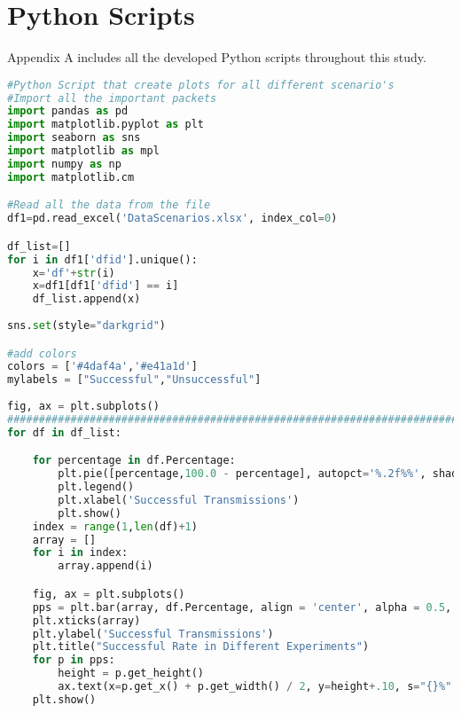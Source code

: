 

\chapter{Python Scripts}

Appendix A includes all the developed Python scripts throughout this study. 



\newpage
\begin{lstlisting}[language=Python, caption = Python Script that create plots for all different scenario's, label=lst:plots]
#Python Script that create plots for all different scenario's
#Import all the important packets
import pandas as pd 
import matplotlib.pyplot as plt 
import seaborn as sns
import matplotlib as mpl
import numpy as np
import matplotlib.cm

#Read all the data from the file
df1=pd.read_excel('DataScenarios.xlsx', index_col=0)

df_list=[]
for i in df1['dfid'].unique():
    x='df'+str(i)
    x=df1[df1['dfid'] == i]
    df_list.append(x)
    
sns.set(style="darkgrid")

#add colors
colors = ['#4daf4a','#e41a1d']
mylabels = ["Successful","Unsuccessful"]
       
fig, ax = plt.subplots()
###########################################################################
for df in df_list:

    for percentage in df.Percentage:
        plt.pie([percentage,100.0 - percentage], autopct='%.2f%%', shadow=True, startangle=90, colors = colors, labels = mylabels)
        plt.legend()
        plt.xlabel('Successful Transmissions')
        plt.show() 
    index = range(1,len(df)+1)
    array = []
    for i in index:
        array.append(i) 

    fig, ax = plt.subplots()
    pps = plt.bar(array, df.Percentage, align = 'center', alpha = 0.5, color = 'maroon', width = 0.5)
    plt.xticks(array)
    plt.ylabel('Successful Transmissions')
    plt.title("Successful Rate in Different Experiments")
    for p in pps:
        height = p.get_height()
        ax.text(x=p.get_x() + p.get_width() / 2, y=height+.10, s="{}%".format(height), ha='center',  weight='bold')
    plt.show()
    
\end{lstlisting}
